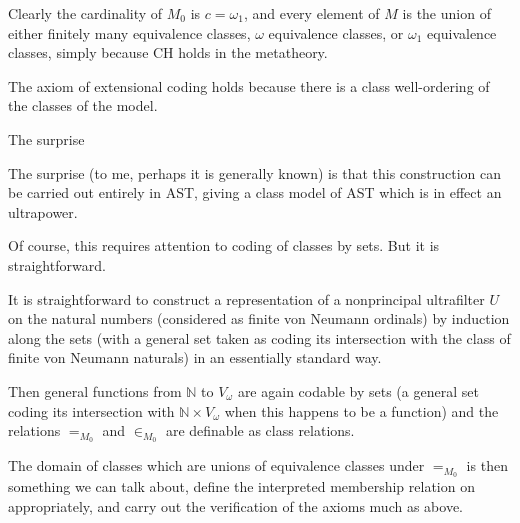 \documentclass{slides}
\begin{document}
\begin{slide}

Clearly the cardinality of $M_0$ is $c = \omega_1$, and every element of $M$ is the union of either finitely many equivalence classes,  $\omega$ equivalence classes, or $\omega_1$ equivalence classes, simply because CH holds in the metatheory.

The axiom of extensional coding holds because there is a class well-ordering of the classes of the model.

\end{slide}

\begin{slide}

{\Large The surprise}

The surprise (to me, perhaps it is generally known) is that this construction can be carried out entirely in AST, giving a class model of AST which is in effect an ultrapower.

Of course, this requires attention to coding of classes by sets.  But it is straightforward.

It is straightforward to construct a representation of a nonprincipal ultrafilter $U$ on the natural numbers (considered as finite von Neumann ordinals) by induction along the sets (with a general set taken as coding its intersection with the class of finite von Neumann naturals) in an essentially standard way.

\end{slide}

\begin{slide}

Then general functions from $\mathbb N$ to $V_\omega$ are again codable by sets (a general set coding its intersection with $\mathbb N \times V_\omega$ when this happens to be a function) and the relations $=_{M_0}$
and $\in_{M_0}$ are definable as class relations.

The domain of classes which are unions of equivalence classes under $=_{M_0}$ is then something we can talk about, define the interpreted membership relation on appropriately, and carry out the verification of the axioms much as above.

\end{slide}
\end{document}

